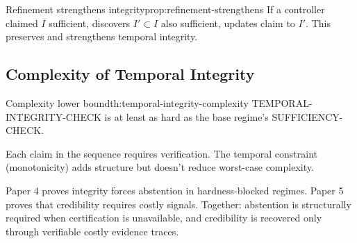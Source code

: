 
\begin{claim}{Refinement strengthens integrity}{prop:refinement-strengthens}
If a controller claimed $I$ sufficient, discovers $I' \subset I$ also sufficient, updates claim to $I'$. This preserves and strengthens temporal integrity.
\end{claim}


\subsection{Complexity of Temporal Integrity}

\begin{claim}{Complexity lower bound}{th:temporal-integrity-complexity}
TEMPORAL-INTEGRITY-CHECK is at least as hard as the base regime's SUFFICIENCY-CHECK.
\end{claim}

Each claim in the sequence requires verification. The temporal constraint (monotonicity) adds structure but doesn't reduce worst-case complexity.

Paper 4 proves integrity forces abstention in hardness-blocked regimes. Paper 5 proves that credibility requires costly signals. Together: abstention is structurally required when certification is unavailable, and credibility is recovered only through verifiable costly evidence traces.

